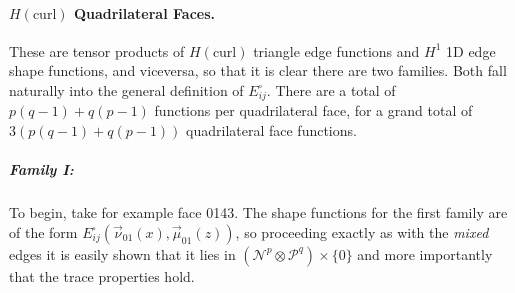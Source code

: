 
\paragraph{\texorpdfstring{$H(\mathrm{curl})$}{Hcurl} Quadrilateral Faces.} 
These are tensor products of $H(\text{curl})$ triangle edge functions and $H^1$ 1D edge shape functions, and viceversa, so that it is clear there are two families. 
Both fall naturally into the general definition of $E_{ij}^\square$.
There are a total of $p(q-1)+q(p-1)$ functions per quadrilateral face, for a grand total of $3(p(q-1)+q(p-1))$ quadrilateral face functions.

\subparagraph{Family I:}
To begin, take for example face 0143. 
The shape functions for the first family are of the form $E_{ij}^\square(\vec{\nu}_{01}(x),\vec{\mu}_{01}(z))$, so proceeding exactly as with the \textit{mixed} edges it is easily shown that it lies in $(\mathcal{N}^p\otimes\mathcal{P}^q)\times\{0\}$ and more importantly that the trace properties hold.

